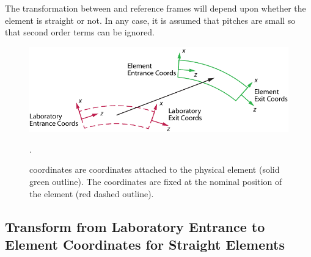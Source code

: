 The transformation between  and  reference
frames will depend upon whether the element is straight or not. In
any case, it is assumed that pitches are small so that second order
terms can be ignored.


\begin{figure}[tb]
  \centering
  \includegraphics[width=5in]{coord-offset.pdf}
  \caption[Element Coordinate System.]
  {
 coordinates are coordinates attached to the physical
element (solid green outline). The  coordinates are
fixed at the nominal position of the element (red dashed outline).
  }
  \label{f:ele.coord}.
\end{figure}

\subsection{Transform from Laboratory Entrance to Element Coordinates for Straight Elements}


